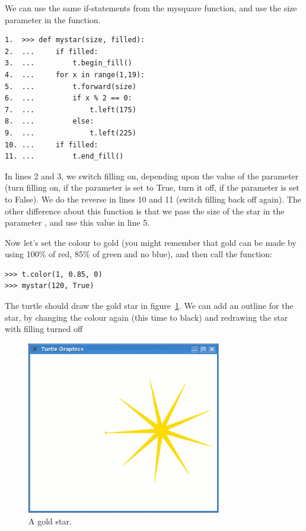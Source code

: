 We can use the same if-statements from the mysquare function, and use the size parameter in the  function.

\begin{listing}
\begin{verbatim}
1.  >>> def mystar(size, filled):
2.  ...     if filled:
3.  ...         t.begin_fill()
4.  ...     for x in range(1,19):
5.  ...         t.forward(size)
6.  ...         if x % 2 == 0:
7.  ...             t.left(175)
8.  ...         else:
9.  ...             t.left(225)
10. ...     if filled:
11. ...         t.end_fill()
\end{verbatim}
\end{listing}

In lines 2 and 3, we switch filling on, depending upon the value of the parameter  (turn filling on, if the parameter is set to True, turn it off, if the parameter is set to False).  We do the reverse in lines 10 and 11 (switch filling back off again).  The other difference about this function is that we pass the size of the star in the parameter , and use this value in line 5.
\par
Now let's set the colour to gold (you might remember that gold can be made by using 100\% of red, 85\% of green and no blue), and then call the function:

\begin{listing}
\begin{verbatim}
>>> t.color(1, 0.85, 0)
>>> mystar(120, True)
\end{verbatim}
\end{listing}

\noindent
The turtle should draw the gold star in figure~\ref{fig29}. We can add an outline for the star, by changing the colour again (this time to black) and redrawing the star with filling turned off

\begin{figure}
\begin{center}
\includegraphics[width=85mm]{eps/figure29.eps}
\end{center}
\caption{A gold star.}\label{fig29}
\end{figure}


